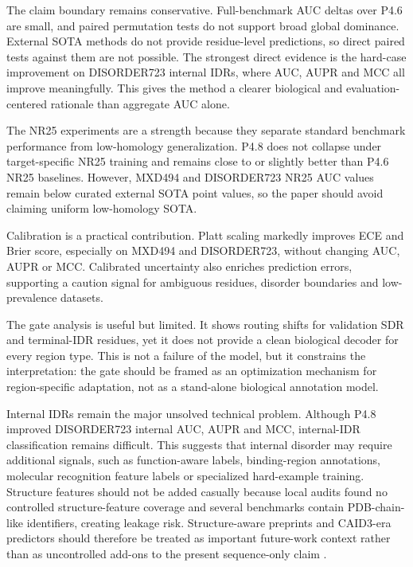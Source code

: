 \documentclass[namedate,webpdf,traditional,large]{oup-authoring-template}
\begin{document}
The claim boundary remains conservative. Full-benchmark AUC deltas over P4.6 are small, and paired permutation tests do not support broad global dominance. External SOTA methods do not provide residue-level predictions, so direct paired tests against them are not possible. The strongest direct evidence is the hard-case improvement on DISORDER723 internal IDRs, where AUC, AUPR and MCC all improve meaningfully. This gives the method a clearer biological and evaluation-centered rationale than aggregate AUC alone.

The NR25 experiments are a strength because they separate standard benchmark performance from low-homology generalization. P4.8 does not collapse under target-specific NR25 training and remains close to or slightly better than P4.6 NR25 baselines. However, MXD494 and DISORDER723 NR25 AUC values remain below curated external SOTA point values, so the paper should avoid claiming uniform low-homology SOTA.

Calibration is a practical contribution. Platt scaling markedly improves ECE and Brier score, especially on MXD494 and DISORDER723, without changing AUC, AUPR or MCC. Calibrated uncertainty also enriches prediction errors, supporting a caution signal for ambiguous residues, disorder boundaries and low-prevalence datasets.

The gate analysis is useful but limited. It shows routing shifts for validation SDR and terminal-IDR residues, yet it does not provide a clean biological decoder for every region type. This is not a failure of the model, but it constrains the interpretation: the gate should be framed as an optimization mechanism for region-specific adaptation, not as a stand-alone biological annotation model.

Internal IDRs remain the major unsolved technical problem. Although P4.8 improved DISORDER723 internal AUC, AUPR and MCC, internal-IDR classification remains difficult. This suggests that internal disorder may require additional signals, such as function-aware labels, binding-region annotations, molecular recognition feature labels or specialized hard-example training. Structure features should not be added casually because local audits found no controlled structure-feature coverage and several benchmarks contain PDB-chain-like identifiers, creating leakage risk. Structure-aware preprints and CAID3-era predictors should therefore be treated as important future-work context rather than as uncontrolled add-ons to the present sequence-only claim \citep{kabir2026esmdispred,wang2026fldpnn3}.
\end{document}

